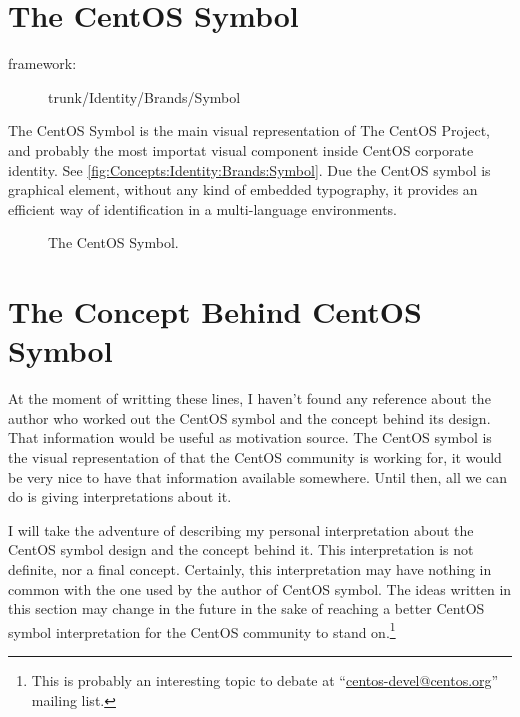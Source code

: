 \section{The CentOS Symbol}
\hypertarget{sec:Concepts:Identity:Brands:Symbol}{}
\label{sec:Concepts:Identity:Brands:Symbol}

\begin{description}
\item[framework:] trunk/Identity/Brands/Symbol
\end{description}

\noindent The CentOS Symbol is the main visual representation of The
CentOS Project, and probably the most importat visual component inside
CentOS corporate identity. See
\autoref{fig:Concepts:Identity:Brands:Symbol}.  Due the CentOS symbol
is graphical element, without any kind of embedded typography, it
provides an efficient way of identification in a multi-language
environments.

\begin{figure}
\begin{center}
\end{center}
\caption{The CentOS Symbol.%
    \label{fig:Concepts:Identity:Brands:Symbol}}
\end{figure}

\section{The Concept Behind CentOS Symbol}
\hypertarget{sec:Concepts:Identity:Brands:SymbolConcept}{}
\label{sec:Concepts:Identity:Brands:SymbolConcept}

At the moment of writting these lines, I haven't found any reference
about the author who worked out the CentOS symbol and the concept
behind its design.  That information would be useful as motivation
source.  The CentOS symbol is the visual representation of that the
CentOS community is working for, it would be very nice to have that
information available somewhere.  Until then, all we can do is giving
interpretations about it.

I will take the adventure of describing my personal interpretation
about the CentOS symbol design and the concept behind it.  This
interpretation is not definite, nor a final concept. Certainly, this
interpretation may have nothing in common with the one used by the
author of CentOS symbol. The ideas written in this section may change
in the future in the sake of reaching a better CentOS symbol
interpretation for the CentOS community to stand on.\footnote{This is
probably an interesting topic to debate at
``\href{mailto:centos-devel@centos.org}{centos-devel@centos.org}''
mailing list.}

